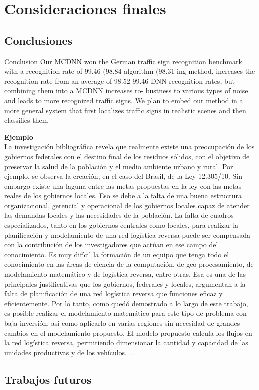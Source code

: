 \chapter{Consideraciones finales}
\setcounter{page}{24}
\renewcommand{\baselinestretch}{2} %


\section{Conclusiones}

Conclusion
Our MCDNN won the German traffic sign recognition benchmark with
a  recognition  rate  of  99.46%
(98.84%
algorithm  (98.31%
ing  method,  increases  the  recognition  rate  from  an  average  of  98.52%
99.46%
DNN  recognition  rates,  but  combining  them  into  a  MCDNN  increases  ro-
bustness to various types of noise and leads to more recognized traffic signs.
We plan to embed our method in a more general system that first localizes
traffic signs in realistic scenes and then classifies them


{\bf Ejemplo}\\
La investigación bibliográfica revela que realmente existe una preocupación de los gobiernos federales con el destino final de los residuos sólidos, con el objetivo de preservar la salud de la población y el medio ambiente urbano y rural. Por ejemplo, se observa la creación, en el caso del Brasil, de la Ley 12.305/10. Sin embargo existe una laguna entre las metas propuestas en la ley con las metas reales de los gobiernos locales. Eso se debe a la falta de una buena estructura organizacional, gerencial y operacional de los gobiernos locales capaz de atender las demandas locales y las necesidades de la población.
\vskip 0.3cm
La falta de cuadros especializados, tanto en los gobiernos centrales como locales, para realizar la planificación y modelamiento de una red logística reversa puede ser compensada con la contribución de los investigadores que actúan en ese campo del conocimiento. Es muy difícil la formación de un equipo que tenga todo el conocimiento en las áreas de ciencia de la computación, de geo procesamiento, de modelamiento matemático y de logística reversa, entre otras. Esa es una de las principales justificativas que los gobiernos, federales y locales, argumentan a la falta de planificación de una red logística reversa que funciones eficaz y eficientemente. 
\vskip 0.3cm
Por lo tanto, como quedó demostrado a lo largo de este trabajo, es posible realizar el modelamiento matemático para este tipo de problema con baja inversión, así como aplicarlo en varias regiones sin necesidad de grandes cambios en el modelamiento propuesto. El modelo propuesto calcula los flujos en la red logística reversa, permitiendo dimensionar la cantidad y capacidad de las unidades productivas y de los vehículos. 
\vskip 0.3cm
...


\section{Trabajos futuros}

